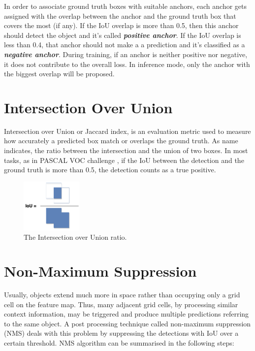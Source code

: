 In order to associate ground truth boxes with suitable anchors, each anchor gets assigned with the overlap between the anchor and the ground truth box that covers the most (if any). If the IoU overlap is more than 0.5, then this anchor should detect the object and it's called \textbf{\textit{positive anchor}}. If the IoU overlap is less than 0.4, that anchor should not make a a prediction and it's classified as a \textbf{\textit{negative anchor}}. During training, if an anchor is neither positive nor negative, it does not contribute to the overall loss. In inference mode, only the anchor with the biggest overlap will be proposed.

\section{Intersection Over Union}
Intersection over Union or Jaccard index, is an evaluation metric used to measure how accurately a predicted box match or overlaps the ground truth. As name indicates, the ratio between the intersection and the union of two boxes. In most tasks, as in PASCAL VOC challenge \cite{everingham2010pascal}, if the IoU between the detection and the ground truth is more than 0.5, the detection counts as a true positive.

\begin{figure}[!htb]
  \centering
  \includegraphics[width=3cm]{../figures/ch2/fig8.png}
  \caption{The Intersection over Union ratio.}
  \label{fig8}
\end{figure} 

\section{Non-Maximum Suppression}
Usually, objects extend much more in space rather than occupying only a grid cell on the feature map. Thus, many adjacent grid cells, by processing similar context information, may be triggered and produce multiple predictions referring to the same object. A post processing technique called non-maximum suppression (NMS) deals with this problem by suppressing the detections with IoU over a certain threshold. NMS algorithm can be summarised in the following steps:

